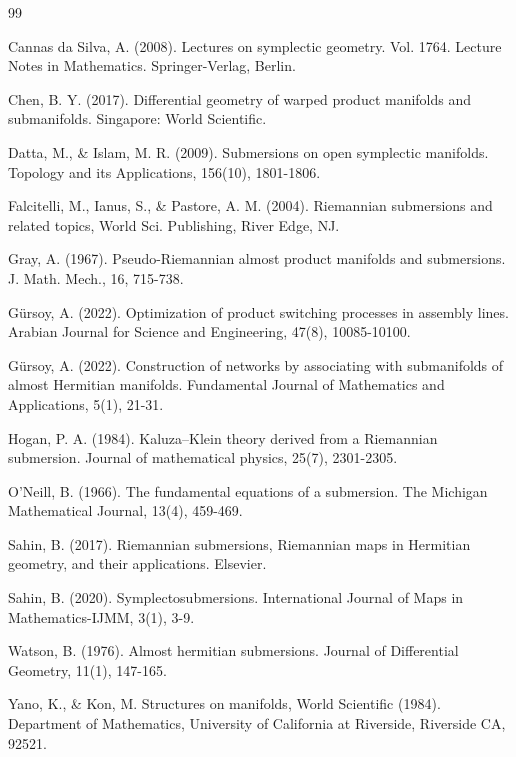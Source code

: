 \documentclass[11pt,reqno]{amsart}
\begin{document}
\begin{thebibliography}{99} %

 Cannas da Silva, A. (2008). Lectures on symplectic geometry. Vol. 1764. Lecture Notes in Mathematics. Springer-Verlag, Berlin.

 Chen, B. Y. (2017). Differential geometry of warped product manifolds and submanifolds. Singapore: World Scientific.

 Datta, M., \& Islam, M. R. (2009). Submersions on open symplectic manifolds. Topology and its Applications, 156(10), 1801-1806.

 Falcitelli, M., Ianus, S., \& Pastore, A. M. (2004). Riemannian submersions and related topics, World Sci. Publishing, River Edge, NJ.

 Gray, A. (1967). Pseudo-Riemannian almost product manifolds and submersions. J. Math. Mech., 16, 715-738.

 Gürsoy, A. (2022). Optimization of product switching processes in assembly lines. Arabian Journal for Science and Engineering, 47(8), 10085-10100.

 Gürsoy, A. (2022). Construction of networks by associating with submanifolds of almost Hermitian manifolds. Fundamental Journal of Mathematics and Applications, 5(1), 21-31.

 Hogan, P. A. (1984). Kaluza–Klein theory derived from a Riemannian submersion. Journal of mathematical physics, 25(7), 2301-2305.

 O'Neill, B. (1966). The fundamental equations of a submersion. The Michigan Mathematical Journal, 13(4), 459-469.

 Sahin, B. (2017). Riemannian submersions, Riemannian maps in Hermitian geometry, and their applications. Elsevier.

 Sahin, B. (2020). Symplectosubmersions. International Journal of Maps in Mathematics-IJMM, 3(1), 3-9.

Watson, B. (1976). Almost hermitian submersions. Journal of Differential Geometry, 11(1), 147-165.

 Yano, K., \& Kon, M. Structures on manifolds, World Scientific (1984). Department of Mathematics, University of California at Riverside, Riverside CA, 92521.


\end{thebibliography}
\end{document}
